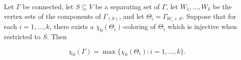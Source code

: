 Let $\Gamma$ be connected, let $S \subseteq V$ be a separating set of $\Gamma$, let $W_1, \ldots, W_k$ be the vertex sets of the components of $\Gamma_{(S)}$, and let $\Theta_i = \Gamma_{W_i + S}$. Suppose that for each $i = 1, \ldots, k$, there exists a $\chi_0(\Theta_i)$-coloring of $\Theta_i$ which is injective when restricted to $S$. Then

$$\chi_0(\Gamma) = \max\{\chi_0(\Theta_i): i = 1, \ldots, k\}.$$

